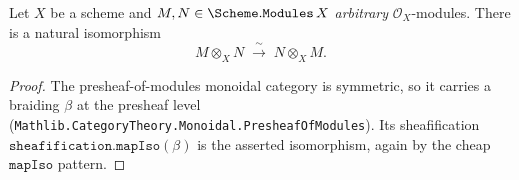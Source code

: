 \begin{lemma}


  \label{lem:tensorobj_comm_iso}
  Let \(X\) be a scheme and \(M, N \in \Scheme.\mathtt{Modules}\,X\)
  \emph{arbitrary} \(\mathcal{O}_X\)-modules. There is a natural isomorphism
  \[
    M \otimes_X N \;\xrightarrow{\ \sim\ }\; N \otimes_X M .
  \]
\end{lemma}

\begin{proof}
  \leanok
  The presheaf-of-modules monoidal category is symmetric, so it carries a
  braiding \(\beta\) at the presheaf level
  (\texttt{Mathlib.CategoryTheory.Monoidal.PresheafOfModules}). Its
  sheafification \(\mathtt{sheafification.mapIso}(\beta)\) is the asserted
  isomorphism, again by the cheap \(\mathtt{mapIso}\) pattern.
\end{proof}

